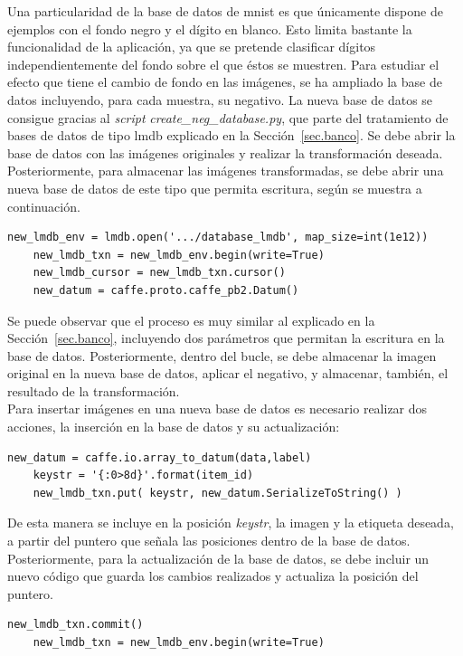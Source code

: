 Una particularidad de la base de datos de \acrshort{mnist} es que únicamente dispone de ejemplos con el fondo negro y el dígito en blanco. Esto limita bastante la funcionalidad de la aplicación, ya que se pretende clasificar dígitos independientemente del fondo sobre el que éstos se muestren. Para estudiar el efecto que tiene el cambio de fondo en las imágenes, se ha ampliado la base de datos incluyendo, para cada muestra, su negativo. La nueva base de datos se consigue gracias al \textit{script} \textit{create\_neg\_database.py}, que parte del tratamiento de bases de datos de tipo \acrshort{lmdb} explicado en la Sección~\ref{sec.banco}. Se debe abrir la base de datos con las imágenes originales y realizar la transformación deseada. Posteriormente, para almacenar las imágenes transformadas, se debe abrir una nueva base de datos de este tipo que permita escritura, según se muestra a continuación.
\vspace{10pt}
\begin{lstlisting}[frame=single]
	new_lmdb_env = lmdb.open('.../database_lmdb', map_size=int(1e12))
	new_lmdb_txn = new_lmdb_env.begin(write=True)
	new_lmdb_cursor = new_lmdb_txn.cursor()
	new_datum = caffe.proto.caffe_pb2.Datum()
	\end{lstlisting}

Se puede observar que el proceso es muy similar al explicado en la Sección~\ref{sec.banco}, incluyendo dos parámetros que permitan la escritura en la base de datos. Posteriormente, dentro del bucle, se debe almacenar la imagen original en la nueva base de datos, aplicar el negativo, y almacenar, también, el resultado de la transformación.\\

Para insertar imágenes en una nueva base de datos es necesario realizar dos acciones, la inserción en la base de datos y su actualización:
\vspace{10pt}
\begin{lstlisting}[frame=single]
	new_datum = caffe.io.array_to_datum(data,label)
	keystr = '{:0>8d}'.format(item_id)
	new_lmdb_txn.put( keystr, new_datum.SerializeToString() )
\end{lstlisting}

De esta manera se incluye en la posición \textit{keystr}, la imagen y la etiqueta deseada, a partir del puntero que señala las posiciones dentro de la base de datos. Posteriormente, para la actualización de la base de datos, se debe incluir un nuevo código que guarda los cambios realizados y actualiza la posición del puntero.
\vspace{10pt}
\begin{lstlisting}[frame=single]
	new_lmdb_txn.commit()
	new_lmdb_txn = new_lmdb_env.begin(write=True)
\end{lstlisting}

